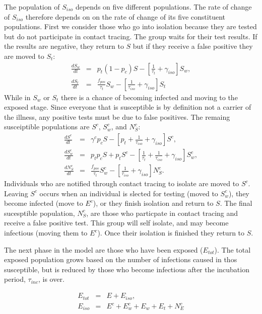 \documentclass[notitlepage, superscriptaddress]{revtex4-2}
\begin{document}
The population of $S_{iso}$ depends on five different populations. The rate of change of $S_{iso}$ therefore depends on on the rate of change of its five constituent populations. First we consider those who go into isolation because they are tested but do not participate in contact tracing. The group waits for their test results. If the results are negative, they return to $S$ but if they receive a false positive they are moved to $S_{t}$:
\begin{eqnarray}
\label{E:dS_iso}
\frac{dS_{w}}{dt} &=& p_{t} (1 -p_{c}) S - [\frac{1}{\tau_{t}}  + \gamma_{iso}] S_{w}, \\
\frac{dS_{t}}{dt} &=& \frac{f_{pos}}{\tau_{t}} S_{w} - [\frac{1}{\tau_{iso}}  + \gamma_{iso}] S_{t}\end{eqnarray}
While in $S_{w}$ or $S_{t}$ there is a chance of becoming infected and moving to the exposed stage. Since everyone that is susceptible is by definition not a carrier of the illness, any positive tests must be due to false positives. The remaing susceiptible populations are $S^{c}$, $S^{c}_{w}$, and $N^{c}_{S}$:
\begin{eqnarray}
\label{E:dSc}
 \frac{dS^{c}}{dt} &=& \gamma^{c} p_{c} S -[p_{t} +\frac{1}{\tau_{iso}} +\gamma_{iso}] S^{c}, \\
 \frac{dS^{c}_{w}}{dt} &=& p_{t}p_{c} S + p_{t}S^{c} - [\frac{1}{\tau_{t}}  + \frac{1}{\tau_{iso}}  + \gamma_{iso}] S^{c}_{w}, \\ 
 \frac{dN^{c}_{S}}{dt} &=& \frac{f_{pos}}{\tau_{t}} S^{c}_{w} - [\frac{1}{\tau_{iso}}  + \gamma_{iso}] N^{c}_{S}.  
\end{eqnarray}
Individuals who are notified through contact tracing to isolate are moved to $S^{c}$. Leaving $S^{c}$ occurs when an individual is slected for testing (moved to $S^{c}_{w}$), they become infected (move to $E^{c}$), or they finish isolation and return to $S$. The final sucesptible population, $N^{c}_{S}$, are those who particpate in contact tracing and receive a false positive test. This group will self isolate, and may become infectious (moving them to $E^{c}$). Once their isolation is finished they return to $S$.

The next phase in the model are those who have been exposed ($E_{tot}$). The total exposed population grows based on the number of infections caused in thos susceptible, but is reduced by those who become infectious after the incubation period, $\tau_{inc}$, is over.

\begin{eqnarray}
\label{E:Etot}
E_{tot} &=& E + E_{iso}, \\ 
E_{iso} &=& E^{c} + E^{c}_{w} + E_{w} + E_{t} + N^{c}_{E}
\end{eqnarray}
\end{document}

